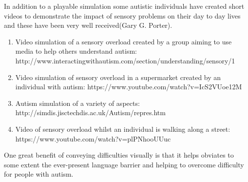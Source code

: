 \documentclass[11pt]{report}
\begin{document}
In addition to a playable simulation some autistic individuals have created short videos to demonstrate the impact of sensory problems on their day to day lives and these have been very well received(Gary G. Porter). 
\begin{enumerate}
\item Video simulation of a sensory overload created by a group aiming to use media to help others understand autism: http://www.interactingwithautism.com/section/understanding/sensory/1
\item Video simulation of sensory overload in a supermarket created by an individual with autism: https://www.youtube.com/watch?v=IcS2VUoe12M
\item Autism simulation of a variety of aspects: http://simdis.jisctechdis.ac.uk/Autism/repres.htm
\item Video of sensory overload whilst an individual is walking along a street: https://www.youtube.com/watch?v=plPNhooUUuc
\end{enumerate}

One great benefit of conveying difficulties visually is that it helps obviates to some extent the ever-present language barrier and helping to overcome difficulty for people with autism.  
\end{document}
